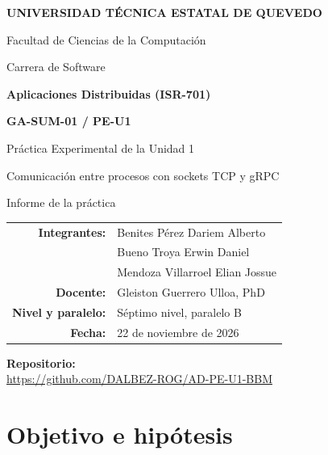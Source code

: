 \documentclass[11pt,a4paper]{article}
\newcommand{\repourl}{https://github.com/DALBEZ-ROG/AD-PE-U1-BBM}
\begin{document}
\begin{titlepage}
\begin{center}
  {\Large\bfseries UNIVERSIDAD TÉCNICA ESTATAL DE QUEVEDO\par}
  \vspace{4pt}
  {\large Facultad de Ciencias de la Computación\par}
  {\large Carrera de Software\par}
  \vspace{1.6cm}
  {\large\bfseries Aplicaciones Distribuidas (ISR-701)\par}
  \vspace{0.8cm}
  {\Large\bfseries GA-SUM-01 / PE-U1\par}
  \vspace{4pt}
  {\large Práctica Experimental de la Unidad 1\par}
  \vspace{4pt}
  {Comunicación entre procesos con sockets TCP y gRPC\par}
  \vspace{4pt}
  {Informe de la práctica\par}
\end{center}
\vspace{1.4cm}
\begin{center}
\renewcommand{\arraystretch}{1.5}
\begin{tabular}{>{\bfseries}r l}
  Integrantes: & Benites Pérez Dariem Alberto \\
               & Bueno Troya Erwin Daniel \\
               & Mendoza Villarroel Elian Jossue \\
  Docente:     & Gleiston Guerrero Ulloa, PhD \\
  Nivel y paralelo: & Séptimo nivel, paralelo B \\
  Fecha:       & 22 de noviembre de 2026 \\
\end{tabular}
\end{center}
\vfill
\begin{center}
  {\bfseries Repositorio:}\\[4pt]
  {\small\url{\repourl}}
\end{center}
\vspace{1cm}
\end{titlepage}

\tableofcontents
\clearpage

\section{Objetivo e hipótesis}
\end{document}
